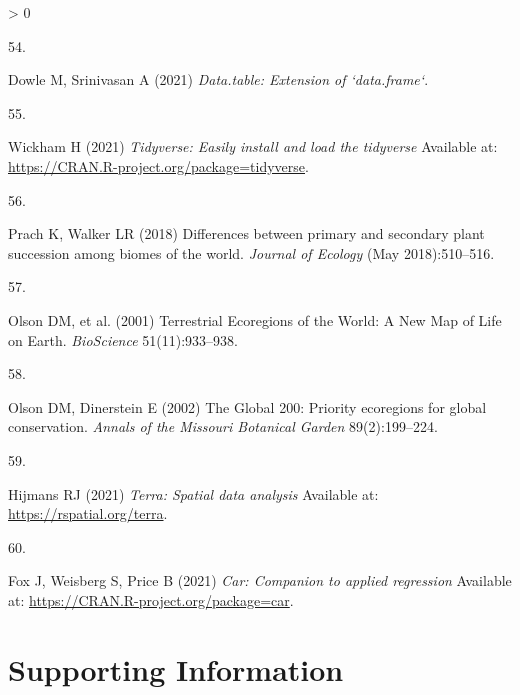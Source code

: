 \documentclass[9pt,twocolumn,twoside,]{pnas-new}
\newlength{\csllabelwidth}
\newlength{\cslhangindent}
\newenvironment{CSLReferences}[2] %
 {%
  \setlength{\parindent}{0pt}
  \ifodd #1 \everypar{\setlength{\hangindent}{\cslhangindent}}\ignorespaces\fi
  \ifnum #2 > 0
  \setlength{\parskip}{#2\baselineskip}
  \fi
 }%
 {}
\newcommand{\CSLLeftMargin}[1]{\parbox[t]{\csllabelwidth}{#1}}
\newcommand{\CSLRightInline}[1]{\parbox[t]{\linewidth - \csllabelwidth}{#1}\break}
\begin{document}
\begin{CSLReferences}{0}{0}
\leavevmode\hypertarget{ref-R-data.table}{}%
\CSLLeftMargin{54. }
\CSLRightInline{Dowle M, Srinivasan A (2021) \emph{Data.table: Extension of `data.frame`}.}

\leavevmode\hypertarget{ref-R-tidyverse}{}%
\CSLLeftMargin{55. }
\CSLRightInline{Wickham H (2021) \emph{Tidyverse: Easily install and load the tidyverse} Available at: \url{https://CRAN.R-project.org/package=tidyverse}.}

\leavevmode\hypertarget{ref-Prach2018}{}%
\CSLLeftMargin{56. }
\CSLRightInline{Prach K, Walker LR (2018) {Differences between primary and secondary plant succession among biomes of the world}. \emph{Journal of Ecology} (May 2018):510--516.}

\leavevmode\hypertarget{ref-Olson2001}{}%
\CSLLeftMargin{57. }
\CSLRightInline{Olson DM, et al. (2001) {Terrestrial Ecoregions of the World: A New Map of Life on Earth}. \emph{BioScience} 51(11):933--938.}

\leavevmode\hypertarget{ref-Olson2002}{}%
\CSLLeftMargin{58. }
\CSLRightInline{Olson DM, Dinerstein E (2002) {The Global 200: Priority ecoregions for global conservation}. \emph{Annals of the Missouri Botanical Garden} 89(2):199--224.}

\leavevmode\hypertarget{ref-R-terra}{}%
\CSLLeftMargin{59. }
\CSLRightInline{Hijmans RJ (2021) \emph{Terra: Spatial data analysis} Available at: \url{https://rspatial.org/terra}.}

\leavevmode\hypertarget{ref-R-car}{}%
\CSLLeftMargin{60. }
\CSLRightInline{Fox J, Weisberg S, Price B (2021) \emph{Car: Companion to applied regression} Available at: \url{https://CRAN.R-project.org/package=car}.}

\end{CSLReferences}

\newpage

\setcounter{figure}{0} \setcounter{section}{0} \setcounter{table}{0} \setcounter{equation}{0} \renewcommand{\thefigure}{S\arabic{figure}} \renewcommand{\thesection}{S\arabic{section}} \renewcommand{\thetable}{S\arabic{table}} \renewcommand\theequation{S\arabic{equation}}

\onecolumn

\hypertarget{supporting-information}{%
\section{Supporting Information}\label{supporting-information}}

\listoffigures
\end{document}
